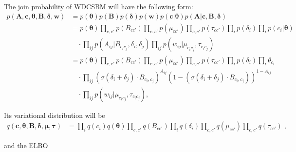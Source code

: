 \documentclass{article}
\renewcommand{\v}[1]{\bm{#1}}
\begin{document}
The join probability of WDCSBM will have the following form:
\begin{equation}
\begin{split}
p(\v{A}, \v{c}, \v{\theta}, \v{B}, \v{\delta}, \v{w})
&= p(\v{\theta}) p(\v{B}) p(\v{\delta}) p(\v{w}) p( \v{c} | \v{\theta} ) p( \v{A} | \v{c}, \v{B} , \v{\delta}) \\
&= p(\v{\theta}) \prod_{c,c'} p(B_{c c'}) \prod_{c,c'} p(\mu_{c c'}) \prod_{c,c'} p(\tau_{c c'}) \prod_{i} p(\delta_i) \prod_i p(c_i | \v{\theta})\\
& \quad \cdot  \prod_{ij} p(A_{ij} | B_{c_i c_j}, \delta_i, \delta_j) \prod_{ij} p(w_{ij} | \mu_{c_i c_j}, \tau_{c_i c_j})\\
&= p(\v{\theta}) \prod_{c,c'} p(B_{c c'}) \prod_{c,c'} p(\mu_{c c'}) \prod_{c,c'} p(\tau_{c c'}) \prod_{i} p(\delta_i) \prod_i \theta_{c_i}\\
& \quad \cdot \prod_{ij} (\sigma(\delta_i + \delta_j) \cdot B_{c_i,c_j})^{A_{ij}} (1 - (\sigma(\delta_i + \delta_j) \cdot B_{c_i,c_j}))^{1 - {A_{ij}}} \\
& \quad \cdot\prod_{ij} p(w_{ij} | \mu_{c_i c_j}, \tau_{c_i c_j}),
\end{split}
\end{equation}

Its variational distribution will be
\begin{equation}
\begin{split}
q(\v{c}, \v{\theta}, \v{B},\v{\delta}, \v{\mu}, \v{\tau})
&= \prod_i q(c_i) q(\v{\theta}) \prod_{c,c'} q(B_{cc'}) \prod_i q(\delta_i) \prod_{c,c'} q(\mu_{cc'}) \prod_{c,c'} q(\tau_{cc'})\; ,
\end{split}
\end{equation}

and the ELBO
\end{document}
